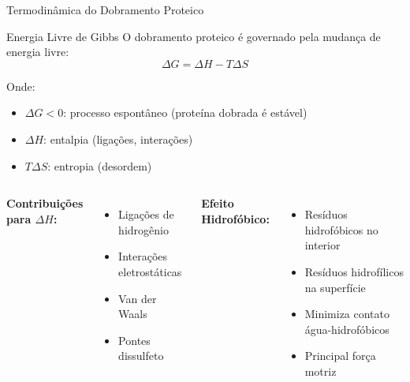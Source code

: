 \begin{frame}[shrink=10]{Termodinâmica do Dobramento Proteico}
\begin{block}{Energia Livre de Gibbs}
O dobramento proteico é governado pela mudança de energia livre:
\begin{equation*}
\Delta G = \Delta H - T\Delta S
\end{equation*}

Onde:
\begin{itemize}
    \item $\Delta G < 0$: processo espontâneo (proteína dobrada é estável)
    \item $\Delta H$: entalpia (ligações, interações)
    \item $T\Delta S$: entropia (desordem)
\end{itemize}
\end{block}

\vspace{0.3cm}

\begin{columns}
\textbf{Contribuições para $\Delta H$:}
\begin{itemize}
    \item Ligações de hidrogênio
    \item Interações eletrostáticas
    \item Van der Waals
    \item Pontes dissulfeto
\end{itemize}

\textbf{Efeito Hidrofóbico:}
\begin{itemize}
    \item Resíduos hidrofóbicos no interior
    \item Resíduos hidrofílicos na superfície
    \item Minimiza contato água-hidrofóbicos
    \item Principal força motriz
\end{itemize}
\end{columns}
\end{frame}

